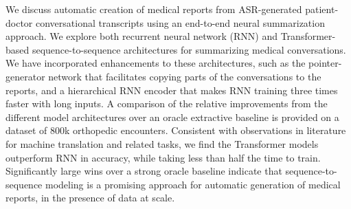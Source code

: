 We discuss automatic creation of medical reports from ASR-generated patient-doctor conversational transcripts using an end-to-end neural summarization approach. We explore both recurrent neural network (RNN) and Transformer-based sequence-to-sequence architectures for summarizing medical conversations. We have incorporated enhancements to these architectures, such as the pointer-generator network that facilitates copying parts of the conversations to the reports, and a hierarchical RNN encoder that makes RNN training three times faster with long inputs. A comparison of the relative improvements from the different model architectures over an oracle extractive baseline is provided on a dataset of 800k orthopedic encounters. Consistent with observations in literature for machine translation and related tasks, we find the Transformer models outperform RNN in accuracy, while taking less than half the time to train. Significantly large wins over a strong oracle baseline indicate that sequence-to-sequence modeling is a promising approach for automatic generation of medical reports, in the presence of data at scale.
